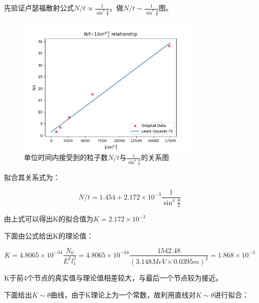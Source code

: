 \documentclass[a4paper,UTF8]{ctexart}
\begin{document}
先验证卢瑟福散射公式$N/t \propto \frac{1}{\sin^4{\frac{\theta}{2}}}$，做$N/t \sim \frac{1}{\sin^4{\frac{\theta}{2}}}$图。

\begin{figure}[H]
    \centering
    \begin{minipage}[b]{0.9\textwidth}
        \centering
        \includegraphics[width=0.8\textwidth]{./r.png}
        \caption{单位时间内接受到的粒子数$N/t$与$\frac{1}{\sin^4{\frac{\theta}{2}}}$的关系图}
    \end{minipage}
\end{figure}

拟合其关系式为：

\begin{equation}
    N/t = 1.454 + 2.172 \times 10^{-3} \frac{1}{\sin^4{\frac{\theta}{2}}}
\end{equation}

由上式可以得出K的拟合值为$K = 2.172 \times 10^{-3}$

下面由公式给出K的理论值：

\begin{equation}
    K = 4.8065 \times 10^{-34} \frac{N_0}{E^2 l_{1}^2} = 4.8065 \times 10^{-34} \frac{1542.48}{(3.148 MeV \times 0.0395m)^2} = 1.868 \times 10^{-3}
\end{equation}

K于前4个节点的真实值与理论值相差较大，与最后一个节点较为接近。

下面给出$K \sim \theta$曲线，由于K理论上为一个常数，故利用直线对$K \sim \theta$进行拟合：
\end{document}
